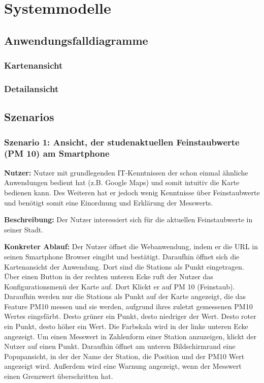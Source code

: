 \section{Systemmodelle}

\subsection{Anwendungsfalldiagramme}

\subsubsection*{Kartenansicht}
\noindent{}

\subsubsection*{Detailansicht}
\noindent{}

\subsection{Szenarios}

\subsubsection*{Szenario 1: Ansicht, der studenaktuellen Feinstaubwerte (PM 10) am Smartphone}
\textbf{Nutzer:} Nutzer mit grundlegenden IT-Kenntnissen der schon einmal ähnliche Anwendungen bedient hat (z.B. Google Maps) 
und somit intuitiv die Karte bedienen kann. Des Weiteren hat er jedoch wenig Kenntnisse über Feinstaubwerte und benötigt somit 
eine Einordnung und Erklärung der \glspl{Messwert}.

\textbf{Beschreibung:} Der Nutzer interessiert sich für die aktuellen Feinstaubwerte in seiner Stadt.

\textbf{Konkreter Ablauf:}
Der Nutzer öffnet die \gls{Webanwendung}, indem er die URL in seinen Smartphone Browser eingibt und bestätigt. Daraufhin öffnet 
sich die Kartenansicht der Anwendung. Dort sind die \glspl{Station} als Punkt eingetragen. Über einen Button in der rechten unteren 
Ecke ruft der Nutzer das Konfigurationsmenü der Karte auf. Dort Klickt er auf PM 10 (Feinstaub). Daraufhin werden nur die 
\glspl{Station} als Punkt auf der Karte angezeigt, die das \gls{Feature} PM10 messen und sie werden, aufgrund ihres zuletzt 
gemessenen PM10 Wertes eingefärbt. Desto grüner ein Punkt, desto niedriger der Wert. Desto roter ein Punkt, desto höher ein Wert. 
Die Farbskala wird in der linke unteren Ecke angezeigt.
Um einen \gls{Messwert} in Zahlenform einer \gls{Station} anzuzeigen, klickt der Nutzer auf einen Punkt. Daraufhin öffnet am 
unteren Bildschirmrand eine Popupansicht, in der der Name der \gls{Station}, die Position und der PM10 Wert angezeigt wird. 
Außerdem wird eine Warnung angezeigt, wenn der \gls{Messwert} einen Grenzwert überschritten hat.

